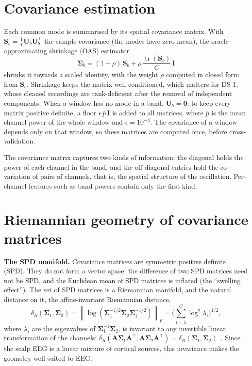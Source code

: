 \section{Covariance estimation}
Each common mode is summarised by its spatial covariance matrix. With
$\mathbf{S}_b=\frac{1}{T}\mathbf{U}_b\mathbf{U}_b^{\top}$ the sample covariance (the modes have
zero mean), the oracle approximating shrinkage (OAS) estimator~\cite{chen2010}
\begin{equation}
\boldsymbol{\Sigma}_b = (1-\rho)\,\mathbf{S}_b + \rho\,\frac{\operatorname{tr}(\mathbf{S}_b)}{C}\,\mathbf{I}
\end{equation}
shrinks it towards a scaled identity, with the weight $\rho$ computed in closed form from
$\mathbf{S}_b$. Shrinkage keeps the matrix well conditioned, which matters for DS-1, whose
cleaned recordings are rank-deficient after the removal of independent components. When a window
has no mode in a band, $\mathbf{U}_b=\mathbf{0}$; to keep every matrix positive definite, a floor
$\epsilon\,\bar{p}\,\mathbf{I}$ is added to all matrices, where $\bar{p}$ is the mean channel power
of the whole window and $\epsilon=10^{-4}$. The covariance of a window depends only on that
window, so these matrices are computed once, before cross-validation.

The covariance matrix captures two kinds of information: the diagonal holds the power of each
channel in the band, and the off-diagonal entries hold the co-variation of pairs of channels,
that is, the spatial structure of the oscillation. Per-channel features such as band powers
contain only the first kind.

\section{Riemannian geometry of covariance matrices}
\textbf{The SPD manifold.} Covariance matrices are symmetric positive definite (SPD). They do not
form a vector space: the difference of two SPD matrices need not be SPD, and the Euclidean mean
of SPD matrices is inflated (the ``swelling effect''). The set of SPD matrices is a Riemannian
manifold, and the natural distance on it, the affine-invariant Riemannian distance,
\begin{equation}
\delta_R(\boldsymbol{\Sigma}_1,\boldsymbol{\Sigma}_2) =
\left\| \log\!\left(\boldsymbol{\Sigma}_1^{-1/2}\boldsymbol{\Sigma}_2\boldsymbol{\Sigma}_1^{-1/2}\right)\right\|_F
= \Big(\sum_{i=1}^{C} \log^2 \lambda_i\Big)^{1/2},
\end{equation}
where $\lambda_i$ are the eigenvalues of $\boldsymbol{\Sigma}_1^{-1}\boldsymbol{\Sigma}_2$, is
invariant to any invertible linear transformation of the channels:
$\delta_R(\mathbf{A}\boldsymbol{\Sigma}_1\mathbf{A}^\top, \mathbf{A}\boldsymbol{\Sigma}_2\mathbf{A}^\top)
=\delta_R(\boldsymbol{\Sigma}_1,\boldsymbol{\Sigma}_2)$~\cite{barachant2012, congedo2017}. Since
the scalp EEG is a linear mixture of cortical sources, this invariance makes the geometry well
suited to EEG.

